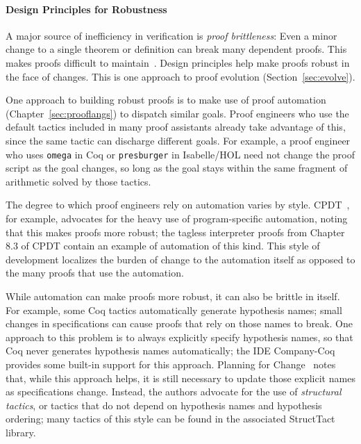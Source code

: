\paragraph{Design Principles for Robustness}
A major source of inefficiency in verification is \textit{proof
  brittleness}: Even a minor change to a single theorem or definition can break many
dependent proofs. This makes proofs difficult to
maintain~\citep{Woos2016, Aydemir2008, plse-coevolve-djg-fose14, Delaware2013ICFP}.
Design principles help make proofs robust in the face of changes.
This is one approach to proof evolution (Section~\ref{sec:evolve}).

One approach to building robust proofs is to make use of proof automation (Chapter~\ref{sec:prooflangs}) to dispatch similar goals.
Proof engineers who use the default tactics included in many proof assistants
already take advantage of this, since the same tactic can discharge different goals.
For example, a proof engineer who uses \lstinline{omega} in Coq or \lstinline{presburger} in
Isabelle/HOL need not change the proof script as the goal changes, so long as the goal stays within
the same fragment of arithmetic solved by those tactics.

The degree to which proof engineers rely on automation varies by style.
CPDT~\citep{CPDT}, for example, advocates for the heavy use of program-specific automation,
noting that this makes proofs more robust; the tagless interpreter proofs from Chapter 8.3 of CPDT contain
an example of automation of this kind.
This style of development localizes the burden of change to the automation itself
as opposed to the many proofs that use the automation.

While automation can make proofs more robust, it can also be brittle in itself.
For example, some Coq tactics automatically generate hypothesis names; small changes in specifications can
cause proofs that rely on those names to break. One approach to this problem is to always explicitly specify hypothesis names,
so that Coq never generates hypothesis names automatically; the IDE Company-Coq~\citep{CompanyCoq2016} provides some built-in
support for this approach.
Planning for Change~\citep{Woos2016} notes that, while this approach helps, it is still necessary to update
those explicit names as specifications change. Instead, the authors advocate for the use of \textit{structural tactics}, or tactics that do not
depend on hypothesis names and hypothesis ordering; many tactics of this style can be found in the associated
StructTact~\citep{structtact} library.

